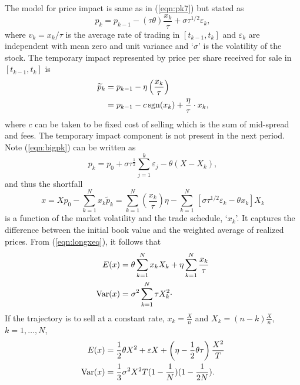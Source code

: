 The model for price impact is same as in (\ref{eqn:pk7}) but stated as
	\begin{equation}\label{eqn:bigpk}
	p_k=p_{k-1} - (\tau\theta)\dfrac{x_k}{\tau} + \sigma\tau^{1/2}\varepsilon_k,
	\end{equation}
where $v_k = x_k/\tau$ is the average rate of trading in $[t_{k-1}, t_k]$ and $\varepsilon_k$ are independent with mean zero and unit variance and `$\sigma$' is the volatility of the stock. The temporary impact represented by price per share received for sale in $[t_{k-1}, t_k]$ is
	\begin{equation}\label{eqn:pdouble}
	\begin{split}
	\widetilde{p}_k &= p_{k-1} - \eta\left(\dfrac{x_k}{\tau}\right) \\
			&= p_{k-1} - c \sgn(x_k) + \frac{\eta}{\tau}\cdot x_k,
	\end{split}
	\end{equation}
where $c$ can be taken to be fixed cost of selling which is the sum of mid-spread and fees. The temporary impact component is not present in the next period. Note (\ref{eqn:bigpk}) can be written as
	\begin{equation}\label{eqn:morepk}
	p_k = p_0 + \sigma\tau^{\frac{1}{2}}\sum_{j=1}^k\varepsilon_j - \theta(X - X_k),
	\end{equation}
and thus the shortfall
	\begin{equation}\label{eqn:longxeq}
	x = Xp_0 - \sum_{k=1}^N x_k\widetilde{p}_k = \sum_{k=1}^N \left(\frac{x_k}{\tau}\right) \eta - \sum_{k=1}^N \,[\sigma\tau^{1/2}\varepsilon_k - \theta x_k]X_k
	\end{equation}
is a function of the market volatility and the trade schedule, `$x_k$'. It captures the difference between the initial book value and the weighted average of realized prices. From (\ref{eqn:longxeq}), it follows that
	\begin{equation}\label{eqn:evardouble}
	\begin{split}
	E(x) &=  \theta\sum_{k=1}^N x_k X_k + \eta\sum_{k=1}^N \frac{x_k}{\tau} \\
	\Var(x) &= \sigma^2\sum_{k=1}^N \tau X_{k}^2\cdot
	\end{split}
	\end{equation}
If the trajectory is to sell at a constant rate, $x_k = \frac{X}{n}$ and $X_k = (n - k)\frac{X}{n}$, $k = 1,\ldots,N$,
	\begin{equation}\label{eqn:secondevardouble}
	\begin{split}
	E(x) &= \frac{1}{2}\theta X^2 + \varepsilon X + \left(\eta - \frac{1}{2}\theta\tau\right)\frac{X^2}{T} \\
	\Var(x) &= \frac{1}{3}\sigma^2X^2T(1 - \frac{1}{N})(1-\frac{1}{2N}).
	\end{split}
	\end{equation}
